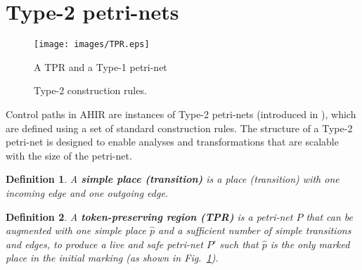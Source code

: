 \documentclass[conference]{IEEEtran}
\newtheorem{definition}{Definition}[section]
\begin{document}
\section{Type-2 petri-nets}
\label{section:type-2}

\begin{figure}[!t]
  \centering
  \texttt{[image: images/TPR.eps]}
  \caption{A TPR and a Type-1 petri-net}
  \label{figure:TPR}
\end{figure}

\begin{figure}[!t]
  \centering
  \hspace{0.125in}
  \caption{Type-2 construction rules.}
  \label{figure:Type-2-TPRs}
\end{figure}

Control paths in AHIR are instances of Type-2 petri-nets (introduced
in \cite{ahir_thesis}), which
are defined using a set of standard construction rules. 
The structure of a Type-2 petri-net is
designed to enable analyses and transformations that are scalable with
the size of the petri-net.

\begin{definition} A {\bf simple place (transition)} is a place
(transition) with one incoming edge and one outgoing edge.
\end{definition}

\begin{definition} A {\bf token-preserving region (TPR)} is a
petri-net $P$ that can be augmented with one simple place $\hat{p}$
and a sufficient number of simple transitions and edges, to produce a
live and safe petri-net $P'$ such that $\hat{p}$ is the only marked
place in the initial marking (as shown in Fig.~\ref{figure:TPR}).
\label{definition:TPR}
\end{definition}
\end{document}
